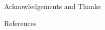 \documentclass[final]{beamer}
\begin{document}
\begin{frame}{}
\begin{textblock}{28}
\begin{block}{Acknowledgements and Thanks}
\begin{multicols}{3}
      \end{multicols}

    \end{block}

    \begin{block}{References}
      
      
    \end{block}


  \end{textblock}

\end{frame}
\end{document}
